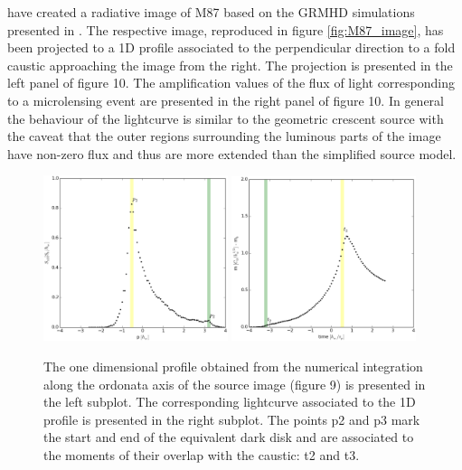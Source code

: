 \citep{2012MNRAS.421.1517D} have created a radiative image of M87 based on the GRMHD simulations presented in \citep{2009MNRAS.394L.126M}. The respective image, reproduced in figure \ref{fig:M87_image}, has been projected to a 1D profile associated to the perpendicular direction to a fold caustic approaching the image from the right. The projection is presented in the left panel of figure 10. The amplification values of the flux of light corresponding to a microlensing event are presented in the right panel of figure 10. In general the behaviour of the lightcurve is similar to the geometric crescent source with the caveat that the outer regions surrounding the luminous parts of the image have non-zero flux and thus are more extended than the simplified source model.

\begin{figure}
\centering
	\includegraphics[width = 0.48\textwidth]{plots/M87_shape.eps}
        \includegraphics[width = 0.48\textwidth]{plots/M87_lc.eps}
\caption{\label{fig:M87_plots} The one dimensional profile obtained from the numerical integration along the ordonata axis of the source image (figure 9) is presented in the left subplot. The corresponding lightcurve associated to the 1D profile is presented in the right subplot. The points p2 and p3 mark the start and end of the equivalent dark disk and are associated to the moments of their overlap with the caustic: t2 and t3.}
\end{figure}






